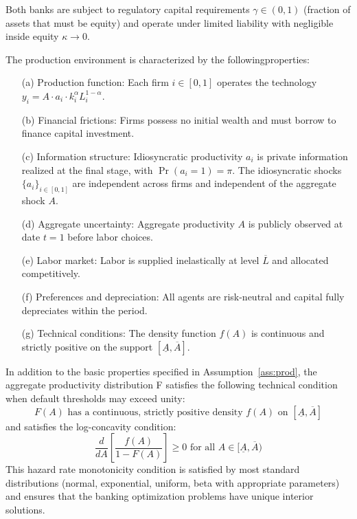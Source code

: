 \documentclass[12pt]{article}
\begin{document}
Both banks are subject to regulatory capital requirements $\gamma \in (0,1)$ (fraction of assets that must be equity) and operate under limited liability with negligible inside equity $\kappa \to 0$.

\begin{assumption}\label{ass:prod}
The production environment is characterized by the following\Allow properties:
\begin{enumerate}
    \item[(a)] Production function: Each firm $i \in [0,1]$ operates the technology $y_{i}=A \cdot a_{i} \cdot k_{i}^{\alpha}L_{i}^{1-\alpha}$.
    \item[(b)] Financial frictions: Firms possess no initial wealth and must borrow to finance capital investment.
    \item[(c)] Information structure: Idiosyncratic productivity $a_{i}$ is private information realized at the final stage, with $\Pr(a_{i}=1)=\pi$. The idiosyncratic shocks $\{a_i\}_{i \in [0,1]}$ are independent across firms and independent of the aggregate shock $A$.
    \item[(d)] Aggregate uncertainty: Aggregate productivity $A$ is publicly observed at date $t=1$ before labor choices.
    \item[(e)] Labor market: Labor is supplied inelastically at level $\overline{L}$ and allocated competitively.
    \item[(f)] Preferences and depreciation: All agents are risk-neutral and capital fully depreciates within the period.
    \item[(g)] Technical conditions: The density function $f(A)$ is continuous and strictly positive on the support $[\underline{A},\overline{A}]$.
\end{enumerate}
\end{assumption}

\begin{assumption}\label{ass:dist}
In addition to the basic properties specified in Assumption~\ref{ass:prod}, the aggregate productivity distribution F satisfies the following technical condition when default thresholds may exceed unity:
\begin{equation}
    F(A) \text{ has a continuous, strictly positive density } f(A) \text{ on } [\underline{A}, \overline{A}]
\end{equation}
and satisfies the log-concavity condition:
\begin{equation}
    \frac{d}{dA}\left[\frac{f(A)}{1-F(A)}\right] \geq 0 \text{ for all } A \in [\underline{A}, \overline{A})
\end{equation}
This hazard rate monotonicity condition is satisfied by most standard distributions (normal, exponential, uniform, beta with appropriate parameters) and ensures that the banking optimization problems have unique interior solutions.
\end{assumption}
\end{document}

